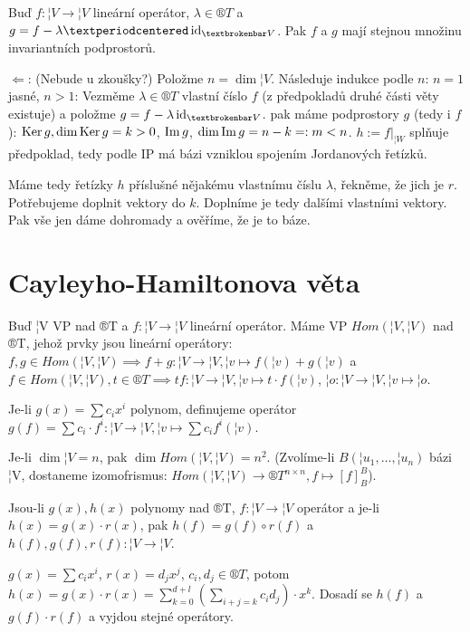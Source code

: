 \documentclass[12pt]{article}                   %
\begin{document}
    \begin{dusledek}
        Buď $f: ¦V \rightarrow ¦V$ lineární operátor, $\lambda \in ®T$ a $g = f - \lambda·\id_{¦V}$. Pak $f$ a $g$ mají stejnou množinu invariantních podprostorů.
    \end{dusledek}

    \begin{dukaz}
        $\Leftarrow$: (Nebude u zkoušky?) Položme $n = \dim ¦V$. Následuje indukce podle $n$: $n = 1$ jasné, $n > 1$: Vezměme $\lambda \in ®T$ vlastní číslo $f$ (z předpokladů druhé části věty existuje) a položme $g = f - \lambda\id_{¦V}$. pak máme podprostory $g$ (tedy i $f$): $\operatorname{Ker} g, \dim \operatorname{Ker} g = k > 0$, $\operatorname{Im} g$, $\dim \operatorname{Im} g = n-k =: m < n$. $h:= f|_{¦W}$ splňuje předpoklad, tedy podle IP má bázi vzniklou spojením Jordanových řetízků.

        Máme tedy řetízky $h$ příslušné nějakému vlastnímu číslu $\lambda$, řekněme, že jich je $r$. Potřebujeme doplnit vektory do $k$. Doplníme je tedy dalšími vlastními vektory. Pak vše jen dáme dohromady a ověříme, že je to báze.
    \end{dukaz}


\section{Cayleyho-Hamiltonova věta}
    \begin{poznamka}
        Buď ¦V VP nad ®T a $f: ¦V \rightarrow ¦V$ lineární operátor. Máme VP $Hom(¦V, ¦V)$ nad ®T, jehož prvky jsou lineární operátory: $f, g \in Hom(¦V, ¦V) \implies f+g: ¦V \rightarrow ¦V, ¦v \mapsto f(¦v) + g(¦v)$ a $f \in Hom(¦V, ¦V), t \in ®T \implies tf: ¦V \rightarrow ¦V, ¦v \mapsto t·f(¦v)$, $¦o: ¦V \rightarrow ¦V, ¦v \mapsto ¦o$.

        Je-li $g(x) = \sum c_ix^i$ polynom, definujeme operátor $g(f) = \sum c_i·f^i : ¦V \rightarrow ¦V, ¦v \mapsto \sum c_i f^i(¦v)$.

        Je-li $\dim ¦V = n$, pak $\dim Hom(¦V, ¦V) = n^2$. (Zvolíme-li $B(¦u_1, …, ¦u_n)$ bázi ¦V, dostaneme izomofrismus: $Hom(¦V, ¦V) \rightarrow ®T^{n \times n}, f \mapsto [f]_B^B$).
    \end{poznamka}

    \begin{pozorovani}
        Jsou-li $g(x), h(x)$ polynomy nad ®T, $f: ¦V \rightarrow ¦V$ operátor a je-li $h(x) = g(x)·r(x)$, pak $h(f) = g(f)\circ r(f)$ a $h(f), g(f), r(f): ¦V \rightarrow ¦V$.

        \begin{dukazin}
            $g(x) = \sum c_ix^i$, $r(x) = d_jx^j$, $c_i, d_j \in ®T$, potom $h(x) = g(x)·r(x) = \sum_{k=0}^{d+l}(\sum_{i+j = k} c_id_j)·x^{k}$. Dosadí se $h(f)$ a $g(f)·r(f)$ a vyjdou stejné operátory.
        \end{dukazin}
    \end{pozorovani}
\end{document}
